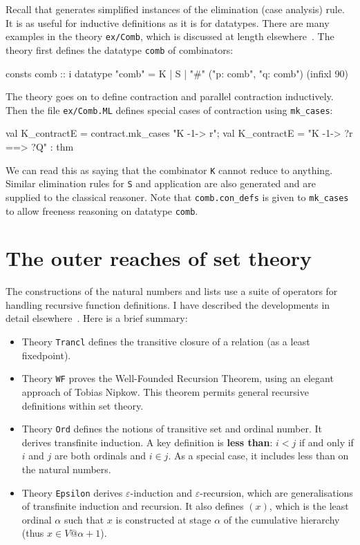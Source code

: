 Recall that  generates simplified instances of the
elimination (case analysis) rule.  It is as useful for inductive definitions
as it is for datatypes.  There are many examples in the theory
\texttt{ex/Comb}, which is discussed at length
elsewhere~\cite{paulson-generic}.  The theory first defines the datatype
\texttt{comb} of combinators:
\begin{ttbox}
consts comb :: i
datatype  "comb" = K
                 | S
                 | "#" ("p: comb", "q: comb")   (infixl 90)
\end{ttbox}
The theory goes on to define contraction and parallel contraction
inductively.  Then the file \texttt{ex/Comb.ML} defines special cases of
contraction using \texttt{mk_cases}:
\begin{ttbox}
val K_contractE = contract.mk_cases "K -1-> r";
{\out val K_contractE = "K -1-> ?r ==> ?Q" : thm}
\end{ttbox}
We can read this as saying that the combinator \texttt{K} cannot reduce to
anything.  Similar elimination rules for \texttt{S} and application are also
generated and are supplied to the classical reasoner.  Note that
\texttt{comb.con_defs} is given to \texttt{mk_cases} to allow freeness
reasoning on datatype \texttt{comb}.

 




\section{The outer reaches of set theory}

The constructions of the natural numbers and lists use a suite of
operators for handling recursive function definitions.  I have described
the developments in detail elsewhere~\cite{paulson-set-II}.  Here is a brief
summary:
\begin{itemize}
  \item Theory \texttt{Trancl} defines the transitive closure of a relation
    (as a least fixedpoint).

  \item Theory \texttt{WF} proves the Well-Founded Recursion Theorem, using an
    elegant approach of Tobias Nipkow.  This theorem permits general
    recursive definitions within set theory.

  \item Theory \texttt{Ord} defines the notions of transitive set and ordinal
    number.  It derives transfinite induction.  A key definition is {\bf
      less than}: $i<j$ if and only if $i$ and $j$ are both ordinals and
    $i\in j$.  As a special case, it includes less than on the natural
    numbers.
    
  \item Theory \texttt{Epsilon} derives $\varepsilon$-induction and
    $\varepsilon$-recursion, which are generalisations of transfinite
    induction and recursion.  It also defines $(x)$, which
    is the least ordinal $\alpha$ such that $x$ is constructed at
    stage $\alpha$ of the cumulative hierarchy (thus $x\in
    V@{\alpha+1}$).
\end{itemize}

